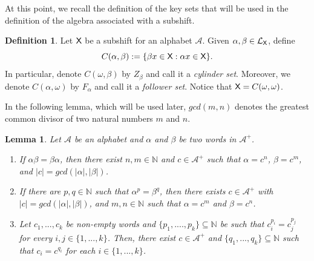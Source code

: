 \documentclass[a4paper,12pt]{amsart}
\newtheorem{lemma}[equation]{Lemma}
\theoremstyle{definition}
\newtheorem{definition}[equation]{Definition}
\theoremstyle{remark}
\numberwithin{equation}{section}
\newcommand{\osf}{{\normalfont \textsf{X}}}
\newcommand{\lang}{\CL_{\osf}}
\newcommand{\alf}{\mathscr{A}}
\newcommand{\N}{\mathbb{N}}
\newcommand{\CL}{\mathcal{L}}
\newcommand{\eword}{\omega}
\begin{document}
At this point, we recall the definition of the key sets that will be used in the definition of the algebra associated with a subshift.

\begin{definition}\label{Arapaima}
Let $\osf$ be a subshift for an alphabet $\alf$. Given $\alpha,\beta\in \lang$, define \[C(\alpha,\beta):=\{\beta x\in\osf:\alpha x\in\osf\}.\] In particular, denote $C(\eword,\beta)$ by $Z_{\beta}$ and call it a \emph{cylinder set}. Moreover, we denote $C(\alpha,\eword)$ by $F_{\alpha}$ and call it a \emph{follower set}. Notice that $\osf=C(\eword,\eword)$.
\end{definition}


In the following lemma, which will be used later, $gcd(m,n)$ denotes the greatest common divisor of two natural numbers $m$ and $n$.

\begin{lemma}\label{gcd1}  Let $\alf$ be an alphabet and $\alpha$ and $\beta$ be two words in $\alf^+$.
\begin{enumerate}[\hspace{.3cm} \rm (1)]
\item If $\alpha\beta=\beta\alpha$, then there exist $n,m\in \N$ and  $c\in \alf^+$ such that $\alpha = c^n$, $\beta=c^m$, and $|c|=gcd(|\alpha|,|\beta|)$. 
\item If there are $p,q\in \N$ such that $\alpha^p=\beta^q$, then there exists $c\in\alf^+$ with $|c|=gcd(|\alpha|, |\beta|)$, and $m,n\in \N$ such that   $\alpha=c^m$ and $\beta=c^n$.

\item Let $c_1,...,c_k$ be non-empty words and $\{p_1,....,p_k\}\subseteq \N$ be such that $c_i^{p_i}=c_j^{p_j}$ for every $i,j\in \{1,...,k\}$. Then, there exist $c\in\alf^+$ and $\{q_1,...,q_k\} \subseteq \N $ such that $c_i=c^{q_i}$ for each $i\in \{1,...,k\}$.
\end{enumerate}

\end{lemma}
\end{document}
